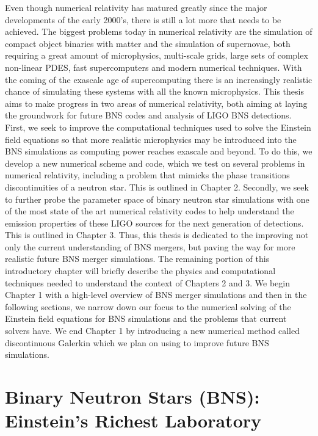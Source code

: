 Even though numerical relativity has matured greatly since the major developments of the early 2000's, there is still a lot more that needs to be achieved. The biggest problems today in numerical relativity are the simulation of compact object binaries with matter and the simulation of supernovae, both requiring a great amount of microphysics, multi-scale grids, large sets of complex non-linear PDES, fast supercomputers and modern numerical techniques. With the coming of the exascale age of supercomputing there is an increasingly realistic chance of simulating these systems with all the known microphysics. This thesis aims to make progress in two areas of numerical relativity, both aiming at laying the groundwork for future BNS codes and analysis of LIGO BNS detections. First, we seek to improve the computational techniques used to solve the Einstein field equations so that more realistic microphysics may be introduced into the BNS simulations as computing power reaches exascale and beyond. To do this, we develop a new numerical scheme and code, which we test on several problems in numerical relativity, including a problem that mimicks the phase transitions discontinuities of a neutron star. This is outlined in Chapter 2. Secondly, we seek to further probe the parameter space of binary neutron star simulations with one of the most state of the art numerical relativity codes to help understand the emission properties of these LIGO sources for the next generation of detections. This is outlined in Chapter 3. Thus, this thesis is dedicated to the improving not only the current understanding of BNS mergers, but paving the way for more realistic future BNS merger simulations. The remaining portion of this introductory chapter will briefly describe the physics and computational techniques needed to understand the context of Chapters 2 and 3. We begin Chapter 1 with a high-level overview of BNS merger simulations and then in the following sections, we narrow down our focus to the numerical solving of the Einstein field equations for BNS simulations and the problems that current solvers have. We end Chapter 1 by introducing a new numerical method called discontinuous Galerkin which we plan on using to improve future BNS simulations.


\section{Binary Neutron Stars (BNS): Einstein's Richest Laboratory}


